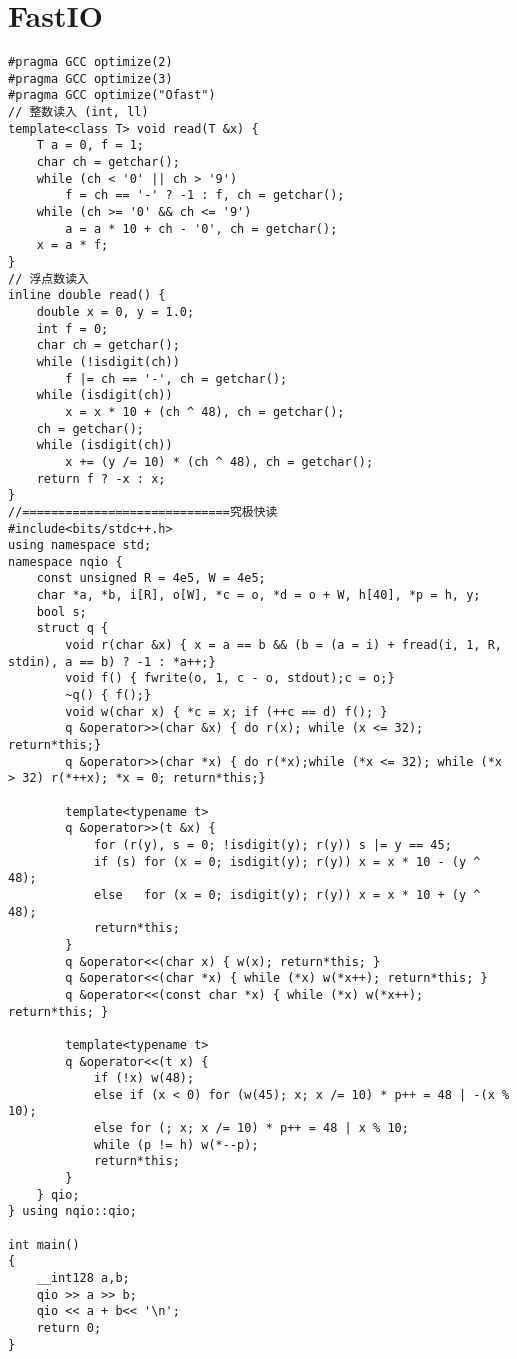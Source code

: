 \section{FastIO}

\begin{verbatim}
#pragma GCC optimize(2)
#pragma GCC optimize(3)
#pragma GCC optimize("Ofast")
// 整数读入 (int, ll)
template<class T> void read(T &x) {
    T a = 0, f = 1;
    char ch = getchar();
    while (ch < '0' || ch > '9')
        f = ch == '-' ? -1 : f, ch = getchar();
    while (ch >= '0' && ch <= '9')
        a = a * 10 + ch - '0', ch = getchar();
    x = a * f;
}
// 浮点数读入
inline double read() {
    double x = 0, y = 1.0;
    int f = 0;
    char ch = getchar();
    while (!isdigit(ch))
        f |= ch == '-', ch = getchar();
    while (isdigit(ch))
        x = x * 10 + (ch ^ 48), ch = getchar();
    ch = getchar();
    while (isdigit(ch))
        x += (y /= 10) * (ch ^ 48), ch = getchar();
    return f ? -x : x;
}
//=============================究极快读
#include<bits/stdc++.h>
using namespace std;
namespace nqio {
    const unsigned R = 4e5, W = 4e5;
    char *a, *b, i[R], o[W], *c = o, *d = o + W, h[40], *p = h, y;
    bool s;
    struct q {
        void r(char &x) { x = a == b && (b = (a = i) + fread(i, 1, R, stdin), a == b) ? -1 : *a++;}
        void f() { fwrite(o, 1, c - o, stdout);c = o;}
        ~q() { f();}
        void w(char x) { *c = x; if (++c == d) f(); }
        q &operator>>(char &x) { do r(x); while (x <= 32); return*this;}
        q &operator>>(char *x) { do r(*x);while (*x <= 32); while (*x > 32) r(*++x); *x = 0; return*this;}
        
        template<typename t>
        q &operator>>(t &x) {
            for (r(y), s = 0; !isdigit(y); r(y)) s |= y == 45;
            if (s) for (x = 0; isdigit(y); r(y)) x = x * 10 - (y ^ 48);
            else   for (x = 0; isdigit(y); r(y)) x = x * 10 + (y ^ 48);
            return*this;
        }
        q &operator<<(char x) { w(x); return*this; }
        q &operator<<(char *x) { while (*x) w(*x++); return*this; }
        q &operator<<(const char *x) { while (*x) w(*x++); return*this; }
        
        template<typename t>
        q &operator<<(t x) {
            if (!x) w(48);
            else if (x < 0) for (w(45); x; x /= 10) * p++ = 48 | -(x % 10);
            else for (; x; x /= 10) * p++ = 48 | x % 10;
            while (p != h) w(*--p);
            return*this;
        }
    } qio;
} using nqio::qio;

int main()
{
    __int128 a,b;
    qio >> a >> b;
    qio << a + b<< '\n';
    return 0;
}
\end{verbatim}
